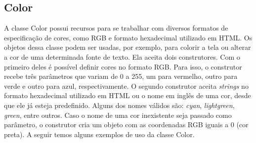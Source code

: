 \subsection{Color}
%
%
A classe Color possui recursos para se trabalhar com diversos formatos de especificação de cores, como RGB e formato hexadecimal utilizado em HTML. Os objetos dessa classe podem ser usadas, por exemplo, para colorir a tela ou alterar a cor de uma determinada fonte de texto. Ela aceita dois construtores. Com o primeiro deles é possível definir cores no formato RGB. Para isso, o construtor recebe três parâmetros que variam de 0 a 255, um para vermelho, outro para verde e outro para azul, respectivamente. O segundo construtor aceita \textit{strings} no formato hexadecimal utilizado em HTML ou o nome em inglês de uma cor, desde que ele já esteja predefinido. Alguns dos nomes válidos são: \textit{cyan}, \textit{lightgreen}, \textit{green}, entre outros. Caso o nome de uma cor inexistente seja passado como parâmetro, o construtor cria um objeto com as coordenadas RGB iguais a 0 (cor preta). A seguir temos alguns exemplos de uso da classe Color.
%
%

%
%
